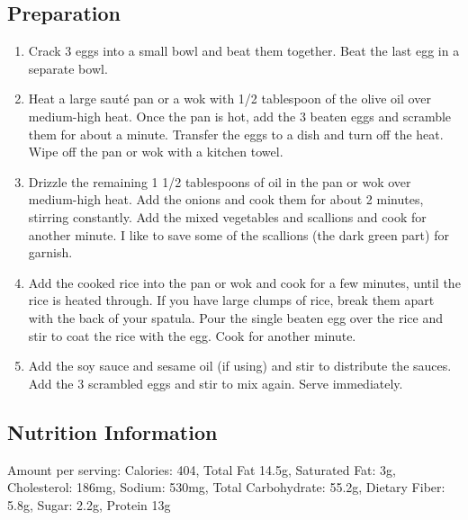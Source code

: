 \subsection{Preparation}
\begin{enumerate}
    \item Crack 3 eggs into a small bowl and beat them together. Beat the last egg in a separate bowl.
    \item Heat a large sauté pan or a wok with 1/2 tablespoon of the olive oil over medium-high heat. Once the pan is hot, add the 3 beaten eggs and scramble them for about a minute. Transfer the eggs to a dish and turn off the heat. Wipe off the pan or wok with a kitchen towel.
    \item Drizzle the remaining 1 1/2 tablespoons of oil in the pan or wok over medium-high heat. Add the onions and cook them for about 2 minutes, stirring constantly. Add the mixed vegetables and scallions and cook for another minute. I like to save some of the scallions (the dark green part) for garnish.
    \item Add the cooked rice into the pan or wok and cook for a few minutes, until the rice is heated through. If you have large clumps of rice, break them apart with the back of your spatula. Pour the single beaten egg over the rice and stir to coat the rice with the egg. Cook for another minute.
    \item Add the soy sauce and sesame oil (if using) and stir to distribute the sauces. Add the 3 scrambled eggs and stir to mix again. Serve immediately.
\end{enumerate}

\subsection{Nutrition Information}
Amount per serving: Calories: 404, Total Fat 14.5g, Saturated Fat: 3g, Cholesterol: 186mg, Sodium: 530mg, Total Carbohydrate: 55.2g, Dietary Fiber: 5.8g, Sugar: 2.2g, Protein 13g

